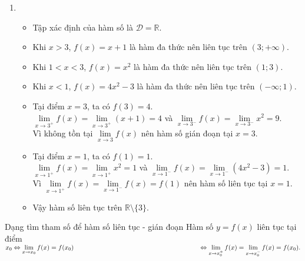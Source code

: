 \begin{bt}
{\begin{enumerate}
\begin{itemize}
				Vì không tồn tại $\lim\limits_{x\to 1}f(x)$ nên hàm số gián đoạn tại $x=-1$.
				\item Vậy hàm số liên tục trên $\mathbb{R}\setminus\{-1\}$.
			\end{itemize}
			\item \begin{itemize}
				\item Tập xác định của hàm số là $\mathscr{D}=\mathbb{R}$.
				\item Khi $x>3$, $f(x)=x+1$ là hàm đa thức nên liên tục trên $(3;+\infty)$.
				\item Khi $1<x<3$, $f(x)=x^2$ là hàm đa thức nên liên tục trên $(1;3)$.
				\item Khi $x<1$, $f(x)=4x^2-3$ là hàm đa thức nên liên tục trên $(-\infty;1)$.
				\item Tại điểm $x=3$, ta có $f(3)=4$.\\
				$\lim\limits_{x\to 3^+}f(x)=\lim\limits_{x\to 3^+}(x+1)=4$ và $\lim\limits_{x\to 3^-}f(x)=\lim\limits_{x\to 3^-}x^2=9$.\\
				Vì không tồn tại $\lim\limits_{x\to 3}f(x)$ nên hàm số gián đoạn tại $x=3$.
				\item Tại điểm $x=1$, ta có $f(1)=1$.\\
				$\lim\limits_{x\to 1^+}f(x)=\lim\limits_{x\to 1^+}x^2=1$ và $\lim\limits_{x\to 1^-}f(x)=\lim\limits_{x\to 1^-}(4x^2-3)=1$.\\
				Vì $\lim\limits_{x\to 1^+}f(x)= \lim\limits_{x\to 1^-}f(x)=f(1)$ nên hàm số liên tục tại $x=1$.
				\item Vậy hàm số liên tục trên $\mathbb{R}\setminus\{3\}$.
			\end{itemize}
	\end{enumerate}}
\end{bt}


\begin{dang}{Dạng tìm tham số để hàm số liên tục - gián đoạn}
Hàm số $ y = f(x) $ liên tục tại điểm $ x_0 \Leftrightarrow \lim\limits_{x \to x_0} f(x) = f(x_0) \\
\hspace*{6.75cm}\Leftrightarrow \lim\limits_{x \to x_0^+} f(x) =\lim\limits_{x \to x_0^-} f(x)= f(x_0).$
\end{dang}

